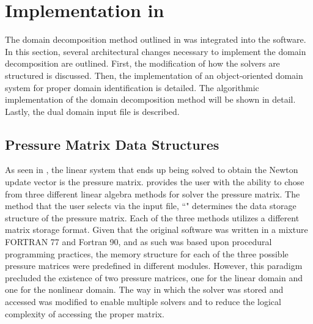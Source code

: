 \section{Implementation in \cobra{}}
\label{sec:dd_algo}

The domain decomposition method outlined in  was integrated into the \cobra{} software.
In this section, several architectural changes necessary to implement the domain decomposition are outlined.
First, the modification of how the solvers are structured is discussed.
Then, the implementation of an object-oriented domain system for proper domain identification is detailed.
The algorithmic implementation of the domain decomposition method will be shown in detail.
Lastly, the dual domain input file is described.

\subsection{Pressure Matrix Data Structures}
\label{subsect:domDecompSolverStructs}

As seen in , the linear system that ends up being solved to obtain the Newton update vector is the pressure matrix.
\cobra{} provides the user with the ability to chose from three different linear algebra methods for solver the pressure matrix.
The method that the user selects via the \cobra{} input file, ``" determines the data storage structure of the pressure matrix.
Each of the three methods utilizes a different matrix storage format.
Given that the original software was written in a mixture FORTRAN 77 and Fortran 90, and as such was based upon procedural programming practices, the memory structure for each of the three possible pressure matrices were predefined in different modules.
However, this paradigm precluded the existence of two pressure matrices, one for the linear domain and one for the nonlinear domain.
The way in which the solver was stored and accessed was modified to enable multiple solvers and to reduce the logical complexity of accessing the proper matrix.

